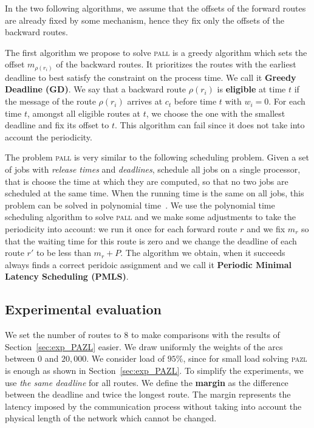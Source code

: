 \documentclass[10pt, conference, letterpaper]{IEEEtran}
\newcommand\pazl{\textsc{pazl}\xspace}
\newcommand\pall{\textsc{pall}\xspace}
\begin{document}
  In the two following algorithms, we assume that the offsets of the forward routes are already fixed by some mechanism, hence they fix only the offsets of the backward routes. 
    
    The first algorithm we propose to solve \pall is a greedy algorithm which sets the offset $m_{\rho(r_i)}$ of the 
    backward routes. It prioritizes the routes with the earliest deadline to best satisfy the
    constraint on the process time. We call it \textbf{Greedy Deadline (GD)}. We say that a backward route $\rho(r_i)$ is {\bf eligible} at time $t$ if the message of the route $\rho(r_i)$ arrives at $c_t$ before time $t$ with $w_i = 0$. For each time $t$, amongst all eligible routes at $t$, we choose the one with the smallest deadline and fix its offset to $t$.
    This algorithm can fail since it does not take into account the periodicity.
    
     The problem \pall is very similar to the following scheduling problem. Given a set of jobs with \emph{release times} and  \emph{deadlines}, schedule all jobs on a single processor, that is choose the time at which they are computed, so that no two jobs are scheduled at the same time. When the running time is the same on all jobs, this problem can be solved in polynomial time~\cite{simons1978fast}. We use the polynomial time scheduling algorithm to solve \pall and we make some adjustments to take the periodicity into account: we run it once for each forward route $r$ and we fix $m_r$ so that the waiting time for this route is zero and we change the deadline of each route $r'$ to be less than $m_{r} + P$. The algorithm we obtain, when it succeeds always finds a correct peridoic assignment and we call it {\bf Periodic Minimal Latency Scheduling (PMLS)}.

     
    \subsection{Experimental evaluation}
    \label{sec:resultsPALL}
    
    We set the number of routes to $8$ to make comparisons with the results of Section~\ref{sec:exp_PAZL} easier. 
    We draw uniformly the weights of the arcs between $0$ and $20,000$. We consider load of $95\%$, since for small load solving \pazl is enough as shown in Section~\ref{sec:exp_PAZL}. To simplify the experiments, 
    we use \emph{the same deadline} for all routes. We define the {\bf margin} as the difference between the deadline and twice the longest route. The margin represents the latency imposed by the communication process without taking into account the physical length of the network which cannot be changed.
  
\end{document}
